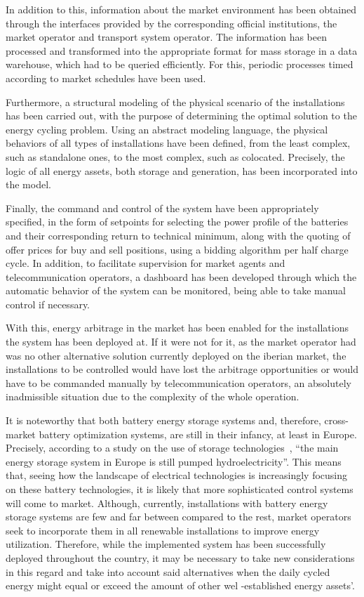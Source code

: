 In addition to this, information about the market environment has been obtained through the interfaces provided by the corresponding official institutions, the market operator and transport system operator. The information has been processed and transformed into the appropriate format for mass storage in a data warehouse, which had to be queried efficiently. For this, periodic processes timed according to market schedules have been used.

Furthermore, a structural modeling of the physical scenario of the installations has been carried out, with the purpose of determining the optimal solution to the energy cycling problem. Using an abstract modeling language, the physical behaviors of all types of installations have been defined, from the least complex, such as standalone ones, to the most complex, such as colocated. Precisely, the logic of all energy assets, both storage and generation, has been incorporated into the model.

Finally, the command and control of the system have been appropriately specified, in the form of setpoints for selecting the power profile of the batteries and their corresponding return to technical minimum, along with the quoting of offer prices for buy and sell positions, using a bidding algorithm per half charge cycle. In addition, to facilitate supervision for market agents and telecommunication operators, a dashboard has been developed through which the automatic behavior of the system can be monitored, being able to take manual control if necessary.

With this, energy arbitrage in the market has been enabled for the installations the system has been deployed at. If it were not for it, as the market operator had was no other alternative solution currently deployed on the iberian market, the installations to be controlled would have lost the arbitrage opportunities or would have to be commanded manually by telecommunication operators, an absolutely inadmissible situation due to the complexity of the whole operation.

It is noteworthy that both battery energy storage systems and, therefore, cross-market battery optimization systems, are still in their infancy, at least in Europe. Precisely, according to a study on the use of storage technologies~\cite{hu2022potential}, ``the main energy storage system in Europe is still pumped hydroelectricity''. This means that, seeing how the landscape of electrical technologies is increasingly focusing on these battery technologies, it is likely that more sophisticated control systems will come to market. Although, currently, installations with battery energy storage systems are few and far between compared to the rest, market operators seek to incorporate them in all renewable installations to improve energy utilization. Therefore, while the implemented system has been successfully deployed throughout the country, it may be necessary to take new considerations in this regard and take into account said alternatives when the daily cycled energy might equal or exceed the amount of other wel -established energy assets'.

